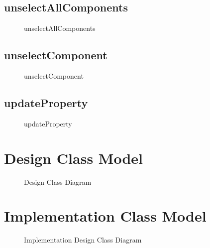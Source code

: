 \documentclass[12pt]{article}
\begin{document}

    \subsection{unselectAllComponents}
    \begin{figure}[H]
        \centering
        
        \caption{unselectAllComponents}
    \end{figure}


    \subsection{unselectComponent}
    \begin{figure}[H]
        \centering
        
        \caption{unselectComponent}
    \end{figure}


    \subsection{updateProperty}
    \begin{figure}[H]
        \centering
        
        \caption{updateProperty}
    \end{figure}



    \section{Design Class Model}

    \begin{figure}[H]
        \centering
        
        \caption{Design Class Diagram}
    \end{figure}




    \section{Implementation Class Model}
    \begin{figure}[H]
        \centering
        
        \caption{Implementation Design Class Diagram}
    \end{figure}
\end{document}
